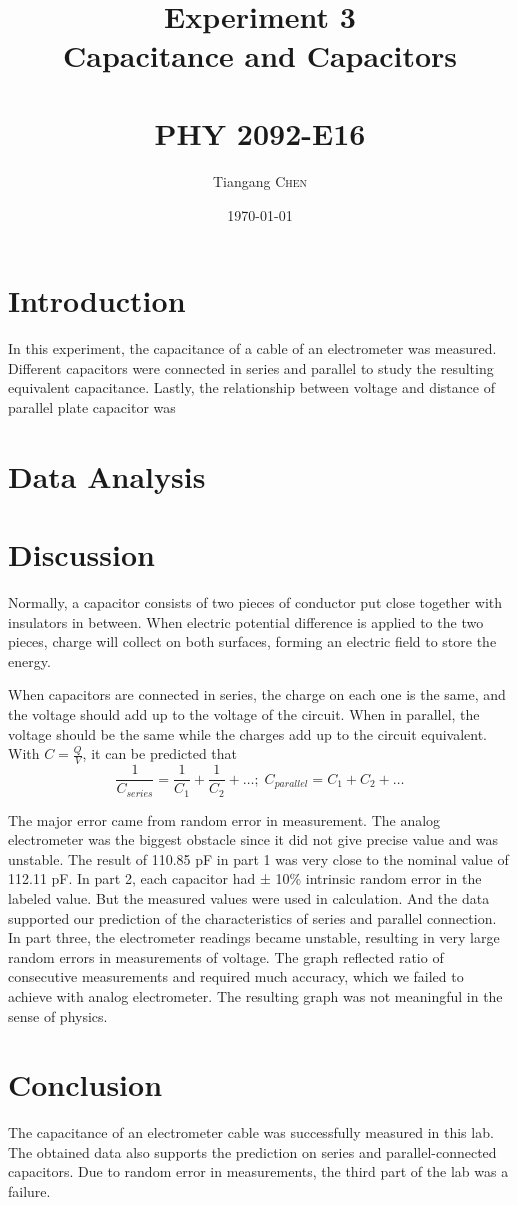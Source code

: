 \documentclass[letterpaper, 12pt]{article}
\title{\hfill \\ \hfill \\ Experiment 3 \\ Capacitance and Capacitors \\ \hfill \\ {\fontsize{45}{30}\selectfont PHY 2092-E16}} %
\author{Tiangang \textsc{Chen}}    %
\date{\today}                      %
\begin{document}
\maketitle

\section{Introduction}
In this experiment, the capacitance of a cable of an electrometer was measured. Different capacitors were connected in series and parallel to study the resulting equivalent capacitance. Lastly, the relationship between voltage and distance of parallel plate capacitor was

\section{Data Analysis}

\clearpage
\section{Discussion}

Normally, a capacitor consists of two pieces of conductor put close together with insulators in between. When electric potential difference is applied to the two pieces, charge will collect on both surfaces, forming an electric field to store the energy.

When capacitors are connected in series, the charge on each one is the same, and the voltage should add up to the voltage of the circuit. When in parallel, the voltage should be the same while the charges add up to the circuit equivalent. With $C=\frac{Q}{V}$, it can be predicted that
\[\frac{1}{C_{series}} =\frac{1}{C_1} + \frac{1}{C_2} +\dots; \; C_{parallel} = C_1 + C_2+\dots\]


The major error came from random error in measurement. The analog electrometer was the biggest obstacle since it did not give precise value and was unstable. The result of 110.85 pF in part 1 was very close to the nominal value of 112.11 pF. In part 2, each capacitor had ± 10\% intrinsic random error in the labeled value. But the measured values were used in calculation. And the data supported our prediction of the characteristics of series and parallel connection. In part three, the electrometer readings became unstable, resulting in very large random errors in measurements of voltage. The graph reflected ratio of consecutive measurements and required much accuracy, which we failed to achieve with analog electrometer. The resulting graph was not meaningful in the sense of physics.


\section{Conclusion}

The capacitance of an electrometer cable was successfully measured in this lab. The obtained data also supports the prediction on series and parallel-connected capacitors. Due to random error in measurements, the third part of the lab was a failure.
\end{document}
